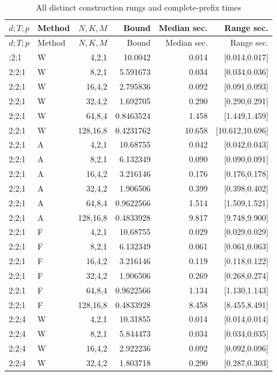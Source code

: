{\small
\setlength{\tabcolsep}{3.5pt}
\begin{longtable}{@{}llrrrr@{}}
\caption{All distinct construction rungs and complete-prefix times}\label{tab:rungs49}\\
\toprule
$d;T;p$ & Method & $N,K,M$ & Bound & Median sec. & Range sec. \\
\midrule
\endfirsthead
\toprule
$d;T;p$ & Method & $N,K,M$ & Bound & Median sec. & Range sec. \\
\midrule
\endhead
\bottomrule
\endfoot
2;2;1 & W & 4,2,1 & 10.0042 & 0.014 & [0.014,0.017] \\
2;2;1 & W & 8,2,1 & 5.591673 & 0.034 & [0.034,0.036] \\
2;2;1 & W & 16,4,2 & 2.795836 & 0.092 & [0.091,0.093] \\
2;2;1 & W & 32,4,2 & 1.692705 & 0.290 & [0.290,0.291] \\
2;2;1 & W & 64,8,4 & 0.8463524 & 1.458 & [1.449,1.459] \\
2;2;1 & W & 128,16,8 & 0.4231762 & 10.658 & [10.612,10.696] \\
2;2;1 & A & 4,2,1 & 10.68755 & 0.042 & [0.042,0.043] \\
2;2;1 & A & 8,2,1 & 6.132349 & 0.090 & [0.090,0.091] \\
2;2;1 & A & 16,4,2 & 3.216146 & 0.176 & [0.176,0.178] \\
2;2;1 & A & 32,4,2 & 1.906506 & 0.399 & [0.398,0.402] \\
2;2;1 & A & 64,8,4 & 0.9622566 & 1.514 & [1.509,1.521] \\
2;2;1 & A & 128,16,8 & 0.4833928 & 9.817 & [9.748,9.900] \\
2;2;1 & F & 4,2,1 & 10.68755 & 0.029 & [0.029,0.029] \\
2;2;1 & F & 8,2,1 & 6.132349 & 0.061 & [0.061,0.063] \\
2;2;1 & F & 16,4,2 & 3.216146 & 0.119 & [0.118,0.122] \\
2;2;1 & F & 32,4,2 & 1.906506 & 0.269 & [0.268,0.274] \\
2;2;1 & F & 64,8,4 & 0.9622566 & 1.134 & [1.130,1.143] \\
2;2;1 & F & 128,16,8 & 0.4833928 & 8.458 & [8.455,8.491] \\
2;2;4 & W & 4,2,1 & 10.31855 & 0.014 & [0.014,0.014] \\
2;2;4 & W & 8,2,1 & 5.844473 & 0.034 & [0.034,0.035] \\
2;2;4 & W & 16,4,2 & 2.922236 & 0.092 & [0.092,0.096] \\
2;2;4 & W & 32,4,2 & 1.803718 & 0.290 & [0.287,0.303] \\

\end{longtable}}
